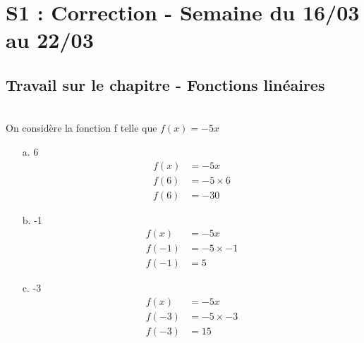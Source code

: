 \documentclass[11pt]{article}
\begin{document}

\newtheorem{Definition}{Définition}
\newtheorem{Theorem}{Théorème}
\newtheorem{Proposition}{Propriété}
\newtheorem{Exo}{Éxercice}

\renewcommand{\labelitemi}{$\bullet$}
\renewcommand{\labelitemii}{$\circ$}

\setlength{\columnseprule}{1pt}

\section{S1 : Correction - Semaine du 16/03 au 22/03}

\subsection{Travail sur le chapitre - Fonctions linéaires}

\\
On considère la fonction f telle que $f(x) = -5x$

\begin{multicols}{3}
\begin{enumerate}
    \item[a.] 6
    \begin{align*}
        f(x) &= -5x \\
        f(6) &= -5 \times 6 \\
        f(6) &= -30    
    \end{align*}\columnbreak

    \item[b.] -1
    \begin{align*}
        f(x) &= -5x \\
        f(-1) &= -5 \times -1 \\
        f(-1) &= 5       
    \end{align*}\columnbreak

    \item[c.] -3
    \begin{align*}
        f(x) &= -5x \\
        f(-3) &= -5 \times -3 \\
        f(-3) &= 15       
    \end{align*}

\end{enumerate}
 \end{multicols}
\end{document}
